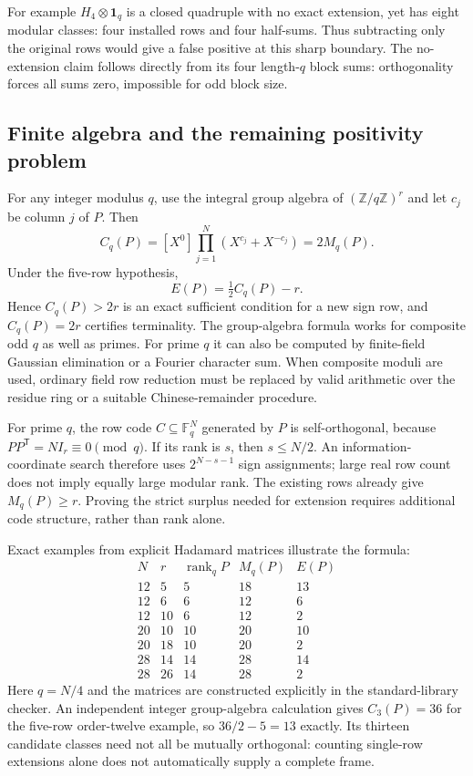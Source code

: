 For example $H_4\otimes\mathbf1_q$ is a closed quadruple with no
exact extension, yet has eight modular classes: four installed rows
and four half-sums. Thus subtracting only the original rows would
give a false positive at this sharp boundary. The no-extension claim
follows directly from its four length-$q$ block sums: orthogonality
forces all sums zero, impossible for odd block size.

\subsection{Finite algebra and the remaining positivity problem}
For any integer modulus $q$, use the integral group algebra of
$(\mathbb Z/q\mathbb Z)^r$ and let $c_j$ be column $j$ of $P$.
Then
\[
 C_q(P)=[X^0]\prod_{j=1}^N(X^{c_j}+X^{-c_j})=2M_q(P).
\]
Under the five-row hypothesis,
\[
 \boxed{E(P)=\tfrac12C_q(P)-r.}
\]
Hence $C_q(P)>2r$ is an exact sufficient condition for a new sign row,
and $C_q(P)=2r$ certifies terminality. The group-algebra formula
works for composite odd $q$ as well as primes. For prime $q$ it can
also be computed by finite-field Gaussian elimination or a Fourier
character sum. When composite moduli are used, ordinary field row
reduction must be replaced by valid arithmetic over the residue ring
or a suitable Chinese-remainder procedure.

For prime $q$, the row code $C\subseteq\mathbb F_q^N$ generated by
$P$ is self-orthogonal, because $PP^{\mathsf T}=NI_r\equiv0\pmod q$.
If its rank is $s$, then $s\le N/2$. An information-coordinate search
therefore uses $2^{N-s-1}$ sign assignments; large real row count
does not imply equally large modular rank. The existing rows already
give $M_q(P)\ge r$. Proving the strict surplus needed for extension
requires additional code structure, rather than rank alone.

Exact examples from explicit Hadamard matrices illustrate the formula:
\[
\begin{array}{c|r|r|r|r}
N&r&\operatorname{rank}_{q}P&M_q(P)&E(P)\\\hline
12&5&5&18&13\\
12&6&6&12&6\\
12&10&6&12&2\\
20&10&10&20&10\\
20&18&10&20&2\\
28&14&14&28&14\\
28&26&14&28&2
\end{array}
\]
Here $q=N/4$ and the matrices are constructed explicitly in the
standard-library checker. An independent integer group-algebra
calculation gives $C_3(P)=36$ for the five-row order-twelve example,
so $36/2-5=13$ exactly. Its thirteen candidate classes need not all
be mutually orthogonal: counting single-row extensions alone does
not automatically supply a complete frame.


